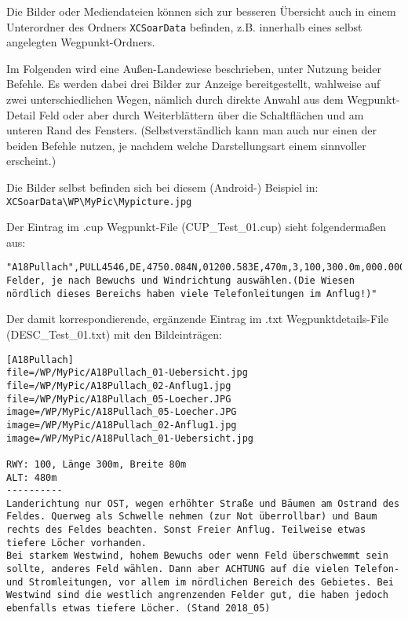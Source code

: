 Die Bilder oder Mediendateien können sich zur besseren Übersicht auch in einem Unterordner des Ordners \verb|XCSoarData| befinden, z.B. innerhalb eines selbst angelegten Wegpunkt-Ordners.



Im Folgenden wird eine Außen-Landewiese beschrieben, unter Nutzung beider Befehle. Es werden dabei drei Bilder zur Anzeige bereitgestellt, wahlweise auf zwei unterschiedlichen Wegen, nämlich durch direkte Anwahl aus dem Wegpunkt-Detail Feld oder aber durch Weiterblättern über die Schaltflächen \button{$<$} und \button{$>$} am unteren Rand des Fensters. (Selbstverständlich kann man auch nur einen der beiden Befehle nutzen, je nachdem welche Darstellungsart einem sinnvoller erscheint.)

Die Bilder selbst befinden sich bei diesem (Android-) Beispiel in: \verb|XCSoarData\WP\MyPic\Mypicture.jpg| 

Der Eintrag im .cup Wegpunkt-File (CUP_Test_01.cup) sieht folgendermaßen aus:

\begin{verbatim}
"A18Pullach",PULL4546,DE,4750.084N,01200.583E,470m,3,100,300.0m,000.000,"Mehrere Felder, je nach Bewuchs und Windrichtung auswählen.(Die Wiesen nördlich dieses Bereichs haben viele Telefonleitungen im Anflug!)"
\end{verbatim}

Der damit korrespondierende, ergänzende Eintrag im .txt Wegpunktdetails-File (DESC_Test_01.txt) mit den Bildeinträgen:

\begin{verbatim}
[A18Pullach]
file=/WP/MyPic/A18Pullach_01-Uebersicht.jpg
file=/WP/MyPic/A18Pullach_02-Anflug1.jpg
file=/WP/MyPic/A18Pullach_05-Loecher.JPG
image=/WP/MyPic/A18Pullach_05-Loecher.JPG
image=/WP/MyPic/A18Pullach_02-Anflug1.jpg
image=/WP/MyPic/A18Pullach_01-Uebersicht.jpg

RWY: 100, Länge 300m, Breite 80m
ALT: 480m
----------
Landerichtung nur OST, wegen erhöhter Straße und Bäumen am Ostrand des Feldes. Querweg als Schwelle nehmen (zur Not überrollbar) und Baum rechts des Feldes beachten. Sonst Freier Anflug. Teilweise etwas tiefere Löcher vorhanden.
Bei starkem Westwind, hohem Bewuchs oder wenn Feld überschwemmt sein sollte, anderes Feld wählen. Dann aber ACHTUNG auf die vielen Telefon- und Stromleitungen, vor allem im nördlichen Bereich des Gebietes. Bei Westwind sind die westlich angrenzenden Felder gut, die haben jedoch ebenfalls etwas tiefere Löcher. (Stand 2018_05) 
\end{verbatim}

